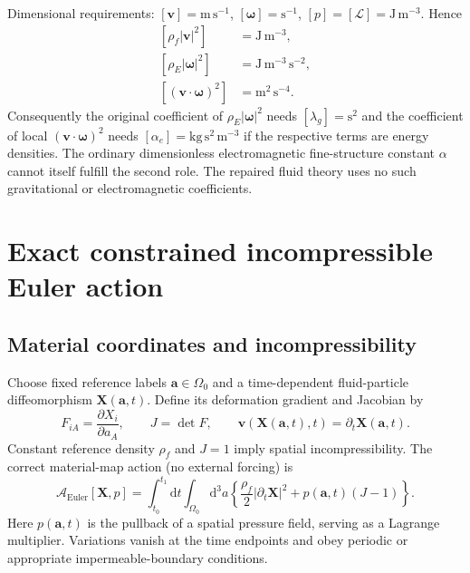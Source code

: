 \documentclass[11pt,a4paper]{article}
\newcommand{\rhoF}{\rho_{\!f}}
\newcommand{\rhoE}{\rho_{\!E}}
\newcommand{\om}{\boldsymbol{\omega}}
\newcommand{\vv}{\mathbf v}
\newcommand{\XX}{\mathbf X}
\newcommand{\dd}{\mathrm d}
\begin{document}
Dimensional requirements: $[\vv]=\mathrm{m\,s^{-1}}$, $[\om]=\mathrm{s^{-1}}$, $[p]=[\mathcal L]=\mathrm{J\,m^{-3}}$. Hence
\begin{align}
\left[\rhoF|\vv|^2\right]&=\mathrm{J\,m^{-3}},\\
\left[\rhoE |\om|^2\right]&=\mathrm{J\,m^{-3}\,s^{-2}},\\
\left[(\vv\cdot\om)^2\right]&=\mathrm{m^2\,s^{-4}}.
\end{align}
Consequently the original coefficient of $\rhoE|\om|^2$ needs $[\lambda_g]=\mathrm{s^2}$ and the coefficient of local $(\vv\cdot\om)^2$ needs $[\alpha_e]=\mathrm{kg\,s^2\,m^{-3}}$ if the respective terms are energy densities. The ordinary dimensionless electromagnetic fine-structure constant $\alpha$ cannot itself fulfill the second role. The repaired fluid theory uses no such gravitational or electromagnetic coefficients.

\section{Exact constrained incompressible Euler action}\label{sec:euler}
\subsection{Material coordinates and incompressibility}
Choose fixed reference labels $\mathbf a\in\Omega_0$ and a time-dependent fluid-particle diffeomorphism $\XX(\mathbf a,t)$. Define its deformation gradient and Jacobian by
\begin{equation}
F_{iA}=\frac{\partial X_i}{\partial a_A},\qquad J=\det F,\qquad \vv(\XX(\mathbf a,t),t)=\partial_t\XX(\mathbf a,t).
\end{equation}
Constant reference density $\rhoF$ and $J=1$ imply spatial incompressibility. The correct material-map action (no external forcing) is
\begin{equation}\label{eq:action}
\boxed{\quad\mathcal A_{\mathrm{Euler}}[\XX,p]
=\int_{t_0}^{t_1}\!\dd t\int_{\Omega_0}\!\dd^3a
\left\{\frac{\rhoF}{2}|\partial_t\XX|^2+p(\mathbf a,t)(J-1)\right\}.\quad}
\end{equation}
Here $p(\mathbf a,t)$ is the pullback of a spatial pressure field, serving as a Lagrange multiplier. Variations vanish at the time endpoints and obey periodic or appropriate impermeable-boundary conditions.
\end{document}
